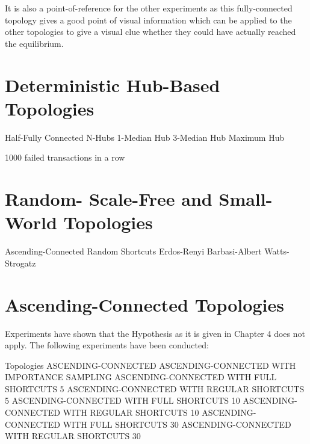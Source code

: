 \documentclass[Bachelorarbeit.tex]{subfiles}
\begin{document}
It is also a point-of-reference for the other experiments as this fully-connected topology gives a good point of visual information which can be applied to the other topologies to give a visual clue whether they could have actually reached the equilibrium.

\section{Deterministic Hub-Based Topologies} 

Half-Fully Connected
N-Hubs
1-Median Hub
3-Median Hub
Maximum Hub

1000 failed transactions in a row

\section{Random- Scale-Free and Small-World Topologies}
Ascending-Connected Random Shortcuts
Erdos-Renyi
Barbasi-Albert
Watts-Strogatz

\section{Ascending-Connected Topologies} 
Experiments have shown that the Hypothesis as it is given in Chapter 4 does not apply. The following experiments have been conducted:

Topologies
ASCENDING-CONNECTED
ASCENDING-CONNECTED WITH IMPORTANCE SAMPLING
ASCENDING-CONNECTED WITH FULL SHORTCUTS 5
ASCENDING-CONNECTED WITH REGULAR SHORTCUTS 5
ASCENDING-CONNECTED WITH FULL SHORTCUTS 10
ASCENDING-CONNECTED WITH REGULAR SHORTCUTS 10
ASCENDING-CONNECTED WITH FULL SHORTCUTS 30
ASCENDING-CONNECTED WITH REGULAR SHORTCUTS 30
\end{document}
